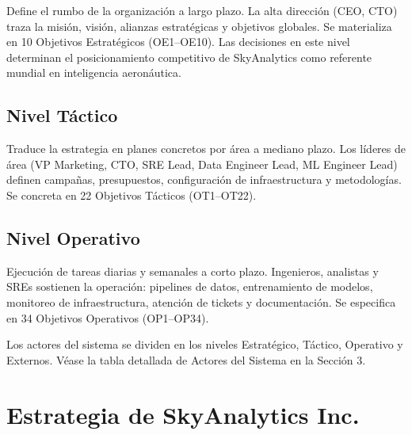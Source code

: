 ﻿\documentclass[11pt, letterpaper]{article}
\begin{document}
Define el rumbo de la organización a largo plazo. La alta dirección (CEO, CTO) traza la misión, visión, alianzas estratégicas y objetivos globales. Se materializa en 10 Objetivos Estratégicos (OE1--OE10). Las decisiones en este nivel determinan el posicionamiento competitivo de SkyAnalytics como referente mundial en inteligencia aeronáutica.



\subsection{Nivel Táctico}



Traduce la estrategia en planes concretos por área a mediano plazo. Los líderes de área (VP Marketing, CTO, SRE Lead, Data Engineer Lead, ML Engineer Lead) definen campañas, presupuestos, configuración de infraestructura y metodologías. Se concreta en 22 Objetivos Tácticos (OT1--OT22).



\subsection{Nivel Operativo}



Ejecución de tareas diarias y semanales a corto plazo. Ingenieros, analistas y SREs sostienen la operación: pipelines de datos, entrenamiento de modelos, monitoreo de infraestructura, atención de tickets y documentación. Se especifica en 34 Objetivos Operativos (OP1--OP34).









Los actores del sistema se dividen en los niveles Estratégico, Táctico, Operativo y Externos. Véase la tabla detallada de Actores del Sistema en la Sección 3.










\section{Estrategia de SkyAnalytics Inc.}
\end{document}
